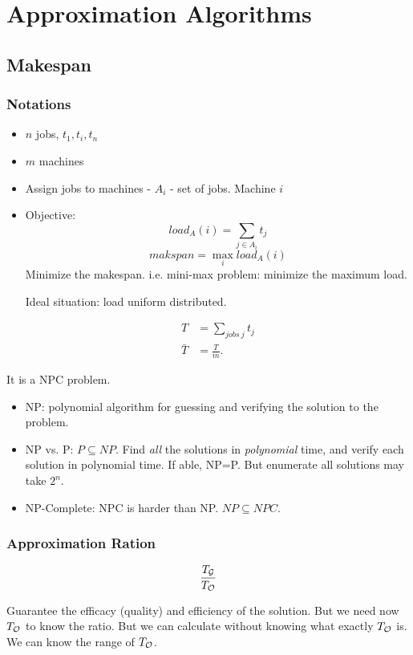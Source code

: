 \documentclass[a4paper]{report}
\theoremstyle{definition}
\begin{document}
\chapter{Approximation Algorithms}
\section{Makespan}
\subsection{Notations}
\begin{itemize}
\item $n$ jobs, $t_1, t_i, t_n$
\item $m$ machines 
\item Assign jobs to machines - $A_i$ - set of jobs. Machine $i$
\item Objective:
$$load_A(i)=\sum_{j\in A_i} t_j$$
$$makspan = \max_i load_A(i)$$
Minimize the makespan. i.e. mini-max problem: minimize the maximum load. 

Ideal situation: load uniform distributed. 

\begin{align*}
T&=\sum_{jobs~j}t_j\\
\bar T &= \frac{T}{m}. 
\end{align*}
\end{itemize}

It is a NPC problem. 

\begin{itemize}
\item NP: polynomial algorithm for guessing and verifying the solution to the problem.
\item NP vs. P: $P\subseteq NP$. Find \textit{all} the solutions in \textit{polynomial} time, and verify each solution in polynomial time. If able, NP=P. But enumerate all solutions may take $2^n$. 
\item NP-Complete: NPC is harder than NP. $NP\subseteq NPC$. 
\end{itemize}

\subsection{Approximation Ration}
$$
\frac{T_{\mathcal{G}}}{T_{\mathcal{O}}}
$$

Guarantee the efficacy (quality) and efficiency of the solution. But we need now $T_{\mathcal{O}}$ to know the ratio. But we can calculate without knowing what exactly $T_{\mathcal{O}}$ is. We can know the range of $T_{\mathcal{O}}$.
\end{document}
